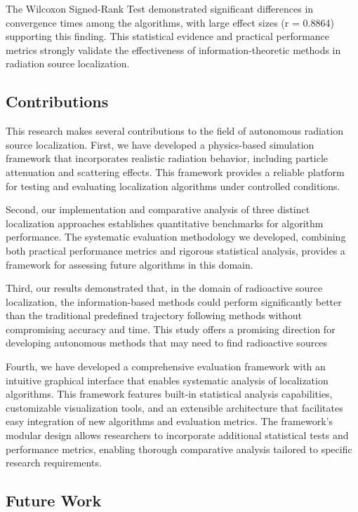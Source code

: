 \documentclass[../report.tex]{subfiles}
\begin{document}
    The Wilcoxon Signed-Rank Test demonstrated significant differences in convergence times among the algorithms, with large effect sizes (r = 0.8864) supporting 
    this finding. This statistical evidence and practical performance metrics strongly validate the effectiveness of information-theoretic methods in radiation 
    source localization.

    \subsection{Contributions}
    \label{sec:conclusions:contributions}

    This research makes several contributions to the field of autonomous radiation source localization. First, we have developed a physics-based 
    simulation framework that incorporates realistic radiation behavior, including particle attenuation and scattering effects. This framework provides a reliable
    platform for testing and evaluating localization algorithms under controlled conditions.

    Second, our implementation and comparative analysis of three distinct localization approaches establishes quantitative benchmarks for algorithm performance. 
    The systematic evaluation methodology we developed, combining both practical performance metrics and rigorous statistical analysis, provides a framework 
    for assessing future algorithms in this domain.

    Third, our results demonstrated that, in the domain of radioactive source localization, the information-based methods could perform significantly better than
    the traditional predefined trajectory following methods without compromising accuracy and time. This study offers a promising direction for developing 
    autonomous methods that may need to find radioactive sources

    Fourth, we have developed a comprehensive evaluation framework with an intuitive graphical interface that enables systematic analysis of localization algorithms.
    This framework features built-in statistical analysis capabilities, customizable visualization tools, and an extensible architecture that facilitates easy 
    integration of new algorithms and evaluation metrics. The framework's modular design allows researchers to incorporate additional statistical tests and 
    performance metrics, enabling thorough comparative analysis tailored to specific research requirements.


    \subsection{Future Work}
    \label{sec:conclusions:future_work}
\end{document}
